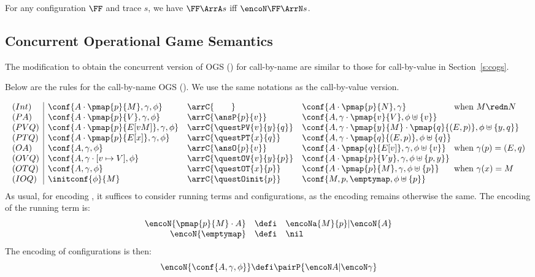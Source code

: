 \begin{corollary}
\label{c:CBNtraces}
For any configuration $\FF$ and trace $s$,
 we have 
  $\FF \ArrA s$   iff 
 $ \encoN \FF  \ArrN s$.
\end{corollary} 

\subsection{Concurrent Operational Game Semantics}
\label{ss:cogs_cbn}
             

The modification to obtain the concurrent version of OGS (\COGS) for call-by-name are
similar to those for call-by-value in Section~\ref{s:cogs}. 

Below are the rules for the call-by-name  OGS (\COGS).  
We use the same notations as the call-by-value version. 

 \setlength{\arraycolsep}{3pt}%
 \[
  \begin{array}{l|lll@{}l}
   (Int) & \conf{A \cdot \pmap{p}{M},\gamma,\phi} & \arrC{\qquad} & 
     \conf{A \cdot \pmap{p}{N},\gamma} & \text{ when } M \redn N\\
%
%
   (PA) & \conf{A \cdot \pmap{p}{V},\gamma,\phi} & \arrC{\ansP{p}{v}} & 
     \conf{A, \gamma \cdot \pmap{v}{V},\phi\uplus \{v\}} \\
%
   (PVQ) & \conf{A \cdot \pmap{p}{E[vM]},\gamma,\phi} & \arrC{\questPV{v}{y}{q}} & 
     \multicolumn{2}{l}{\conf{A, \gamma \cdot \pmap{y}{M}\cdot \pmap{q}{(E,p)},\phi\uplus \{y,q\}}} \\
%
   (PTQ) & \conf{A \cdot \pmap{p}{E[x]},\gamma,\phi} & \arrC{\questPT{x}{q}} & 
     \conf{A, \gamma \cdot \pmap{q}{(E,p)},\phi \uplus \{q\}} \\
%
   (OA) & \conf{A, \gamma,\phi} & \arrC{\ansO{p}{v}} & 
     \conf{A \cdot \pmap{q}{E[v]},\gamma,\phi \uplus \{v\}} & \text{ when } \gamma(p) = (E,q)  \\

%
   (OVQ) & \conf{A, \gamma \cdot [v \mapsto V],\phi} & \arrC{\questOV{v}{y}{p}} & 
     \conf{A \cdot \pmap{p}{V y},\gamma,\phi \uplus \{p,y\}} &\\
%
   (OTQ) & \conf{A,\gamma,\phi} & \arrC{\questOT{x}{p}} & 
     \conf{A \cdot \pmap{p}{M},\gamma,\phi \uplus \{p\}} & \text{ when } \gamma(x) = M\\
%
   (IOQ) &\initconf{\phi}{M}  & 
 \arrC{\questOinit{p}}
 &
     \conf{M,p,\emptymap,\phi \uplus \{p\}}
  \end{array}
 \]
\noindent
As usual, for encoding   \COGS,
it suffices  to consider
 running
terms and configurations,  as the encoding remains otherwise the same.
The encoding of the running term is: 
\[ 
\begin{array}{rcl}
\encoN{\pmap{p}{M}\cdot A  } & \defi & 
\encoNa  {M}{p} | \encoN{ A  } \\
\encoN{\emptymap} & \defi & \nil
\end{array} 
\]
The encoding of configurations is then:
\[
\encoN{\conf{ A , \gamma, \phi } }
\defi  \pairP{  \encoN A
 | \encoN \gamma }
\]



